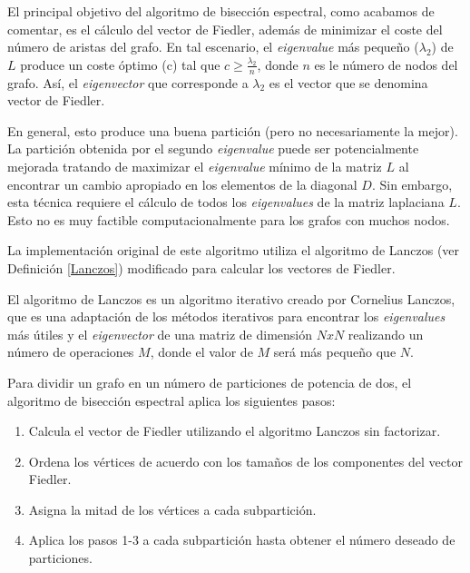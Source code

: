 El principal objetivo del algoritmo de bisección espectral, como acabamos de comentar, es el cálculo del vector de Fiedler\cite{Fiedler}, además de minimizar el coste del número de aristas del grafo. En tal escenario, el \textit{eigenvalue} más pequeño ($\lambda_{2}$) de $L$ produce un coste óptimo (c) tal que $c \geqslant \frac{\lambda_{2}}{n}$, donde $n$ es le número de nodos del grafo. Así, el \textit{eigenvector} que corresponde a $\lambda_{2}$ es el vector que se denomina vector de Fiedler. 

En general, esto produce una buena partición (pero no necesariamente la mejor). La partición obtenida por el segundo \textit{eigenvalue} puede ser potencialmente mejorada tratando de maximizar el \textit{eigenvalue} mínimo de la matriz $L$ al encontrar un cambio apropiado en los elementos de la diagonal $D$. Sin embargo, esta técnica requiere el cálculo de todos los \textit{eigenvalues} de la matriz laplaciana $L$. Esto no es muy factible computacionalmente para los grafos con muchos nodos.

La implementación original de este algoritmo utiliza el algoritmo de Lanczos (ver Definición \ref{Lanczos}) modificado para calcular los vectores de Fiedler\cite{Fiedler}. 

\begin{mydef}\label{Lanczos}
	El algoritmo de Lanczos es un algoritmo iterativo creado por Cornelius Lanczos\cite{Lanczos}, que es una adaptación de los métodos iterativos para encontrar los \textit{eigenvalues} más útiles y el \textit{eigenvector} de una matriz de dimensión $N x N$ realizando un número de operaciones $M$, donde el valor de $M$ será más pequeño que $N$. 
\end{mydef}

Para dividir un grafo en un número de particiones de potencia de dos, el algoritmo de bisección espectral aplica los siguientes pasos:

\begin{enumerate}
	\item Calcula el vector de Fiedler utilizando el algoritmo Lanczos sin factorizar.
	\item Ordena los vértices de acuerdo con los tamaños de los componentes del vector Fiedler.
	\item Asigna la mitad de los vértices a cada subpartición.
	\item Aplica los pasos 1-3 a cada subpartición hasta obtener el número deseado de particiones.
\end{enumerate}

